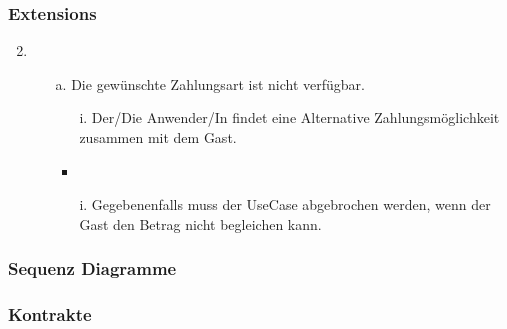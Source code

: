 \documentclass[./detailed_overview_usecases.tex]{subfiles}
\begin{document}
    \subsubsection*{Extensions}
    \begin{enumerate}
        \setcounter{enumi}{1}
        \item \begin{itemize}
                  \item[a.] Die gewünschte Zahlungsart ist nicht verfügbar.
                  \begin{itemize}
                      \item[i.] Der/Die Anwender/In findet eine Alternative Zahlungsmöglichkeit zusammen mit dem Gast.
                  \end{itemize}
                  \begin{itemize}
                      \item \item[i.] Gegebenenfalls muss der UseCase abgebrochen werden, wenn der Gast den Betrag nicht begleichen kann.
                  \end{itemize}
        \end{itemize}
    \end{enumerate}

    \subsubsection{Sequenz Diagramme}
    \subsubsection{Kontrakte}
\end{document}
